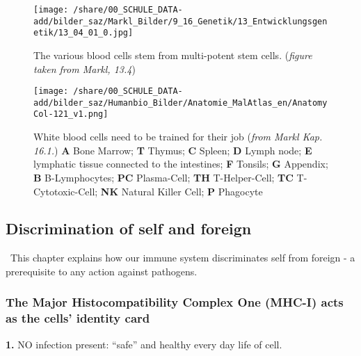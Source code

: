 \hspace{-3cm}
    \begin{figure}[htbp]
    \begin{minipage}{7cm}

      \texttt{[image: /share/00\_SCHULE\_DATA-add/bilder\_saz/Markl\_Bilder/9\_16\_Genetik/13\_Entwicklungsgenetik/13\_04\_01\_0.jpg]}
      \caption{The various blood cells stem from multi-potent stem cells. (\textit{figure taken from Markl, 13.4}) }  \label{fig:BlutGenese}
    \end{minipage}\hfill
    \begin{minipage}{9cm}
     \hfill
      \texttt{[image: /share/00\_SCHULE\_DATA-add/bilder\_saz/Humanbio\_Bilder/Anatomie\_MalAtlas\_en/AnatomyCol-121\_v1.png]}
      \caption{White blood cells need to be trained for their job (\textit{from Markl Kap. 16.1.}) \textbf{A} Bone Marrow; \textbf{T} Thymus; \textbf{C} Spleen; \textbf{D} Lymph node; \textbf{E} lymphatic tissue connected to the intestines; \textbf{F} Tonsils; \textbf{G} Appendix; \textbf{B} B-Lymphocytes; \textbf{PC} Plasma-Cell; \textbf{TH} T-Helper-Cell; \textbf{TC} T-Cytotoxic-Cell; \textbf{NK} Natural Killer Cell; \textbf{P} Phagocyte
      }  \label{fig:LymphOrgane}
    \end{minipage}
	 \end{figure}




\clearpage \enlargethispage{1.8cm}
\subsection{Discrimination of self and foreign}
\Pointinghand\, This chapter explains how our immune system discriminates self from foreign - a prerequisite to any action against pathogens.

\subsubsection{The Major Histocompatibility Complex One (MHC-I) acts as the cells' identity card}
\begin{mdframed}[style=RedGray]
\textbf{ 1.} NO infection present: "`safe"' and healthy every day life of cell.
\end{mdframed}



